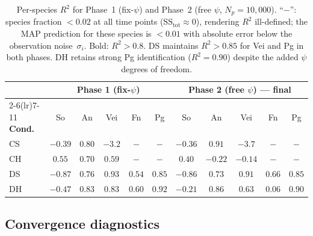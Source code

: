 \documentclass[11pt,a4paper]{article}
\begin{document}
\begin{table}[h!]
\centering\small
\begin{tabular}{@{}l ccccc ccccc@{}}
\toprule
& \multicolumn{5}{c}{\textbf{Phase 1 (fix-$\psi$)}} & \multicolumn{5}{c}{\textbf{Phase 2 (free $\psi$) --- final}}\\
\cmidrule(lr){2-6}\cmidrule(lr){7-11}
\textbf{Cond.} & So & An & Vei & Fn & Pg & So & An & Vei & Fn & Pg\\
\midrule
CS  & $-0.39$ & $0.80$ & $-3.2$ & $-$ & $-$ & $-0.36$ & $\mathbf{0.91}$ & $-3.7$ & $-$ & $-$\\
CH  & $0.55$  & $0.70$ & $0.59$  & $-$ & $-$ & $0.40$  & $-0.22$ & $-0.14$ & $-$ & $-$\\
DS  & $-0.87$ & $0.76$ & $\mathbf{0.93}$ & $0.54$ & $\mathbf{0.85}$ & $-0.86$ & $0.73$ & $\mathbf{0.91}$ & $0.66$ & $\mathbf{0.85}$\\
DH  & $-0.47$ & $\mathbf{0.83}$ & $\mathbf{0.83}$ & $0.60$ & $\mathbf{0.92}$ & $-0.21$ & $\mathbf{0.86}$ & $0.63$ & $0.06$ & $\mathbf{0.90}$\\
\bottomrule
\end{tabular}
\caption{Per-species $R^2$ for Phase~1 (fix-$\psi$) and Phase~2 (free $\psi$, $N_p=10{,}000$).
``$-$'': species fraction $<0.02$ at all time points ($\mathrm{SS}_{\mathrm{tot}}\approx0$), rendering $R^2$ ill-defined; the MAP prediction for these species is $<0.01$ with absolute error below the observation noise~$\sigma_i$.
Bold: $R^2>0.8$.
DS maintains $R^2>0.85$ for Vei and Pg in both phases. DH retains strong Pg identification ($R^2=0.90$) despite the added $\psi$ degrees of freedom.}
\label{tab:r2_species}
\end{table}

\subsection{Convergence diagnostics}
\end{document}
